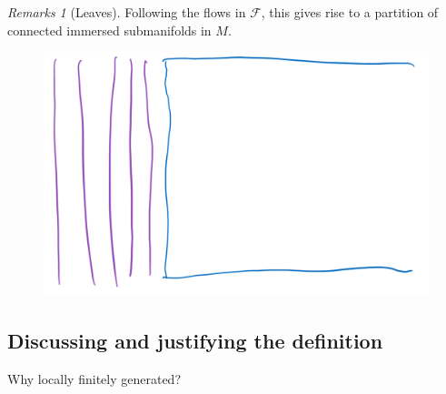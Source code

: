 \documentclass[hyperref={pdfpagelabels=false}]{beamer}
\theoremstyle{plain}
\theoremstyle{remark}
\newtheorem*{remark}{Remarks}
\begin{document}
\begin{frame}
\begin{remark}[Leaves]
Following the flows in $\mathcal{F}$, this gives rise to a partition of connected immersed submanifolds in $M$.
\end{remark}

\begin{figure}[htbp]
	\centering
		\includegraphics[width=.70\textwidth]{Foliation example.png}
	\label{fig:Foliation example}
\end{figure}

\end{frame}

{
\setbeamertemplate{}
\subsection{Discussing and justifying the definition}
\begin{frame}{Why locally finitely generated?}

\end{frame}

}

%
\end{document}

